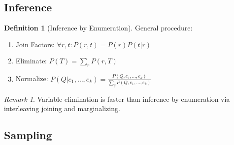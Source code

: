 \documentclass[11pt]{article}
\theoremstyle{definition}
\newtheorem{definition}{Definition}[section]
\theoremstyle{remark}
\newtheorem*{remark}{Remark}
\begin{document}
\subsection{Inference}
\begin{definition}[Inference by Enumeration]
General procedure:
\begin{enumerate}
\item Join Factors: $\forall r,t: P(r,t)=P(r)P(t|r)$
\item Eliminate: $P(T)=\sum_r P(r,T)$
\item Normalize: $P(Q|e_1,\dots,e_k)=\frac{P(Q,e_1,\dots,e_k)}{\sum_q P(Q,e_1,\dots,e_k)}$
\end{enumerate}
\end{definition}

\begin{remark}
Variable elimination is faster than inference by enumeration via interleaving joining and marginalizing.
\end{remark}

\subsection{Sampling}
\end{document}
